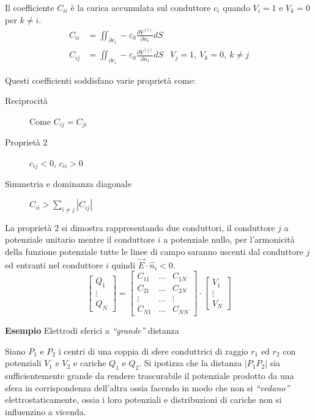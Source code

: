 Il coefficiente $C_{ii}$ è la carica accumulata sul conduttore $c_i$ quando $V_i=1$ e $V_k = 0$
per $k\neq i$.
$$
\begin{aligned}
C_{ii} &= \iint_{\partial c_i} -\varepsilon_0\frac{\partial V^{(i)}}{\partial n_i} dS\\
C_{ij} &= \iint_{\partial c_i} -\varepsilon_0\frac{\partial V^{(j)}}{\partial n_i} dS & V_j = 1,\ 
V_k = 0,\ k\neq j
\end{aligned}
$$

Questi coefficienti soddisfano varie proprietà come:

\begin{description}
 \item[Reciprocità] Come $C_{ij} = C_{ji} $
 \item[Proprietà 2] $c_{ij} < 0 $, $c_{ii}>0$
 \item[Simmetria e dominanza diagonale] $C_{ii} > \sum_{i\neq j}|C_{ij}|$
\end{description}
La proprietà 2 si dimostra rappresentando due conduttori, il conduttore $j$ a 
potenziale unitario mentre il conduttore $i$ a potenziale nullo, per l'armonicità della funzione
potenziale tutte le linee di campo saranno uscenti dal conduttore $j$ ed entranti nel conduttore 
$i$ quindi $\vec{E}\cdot\hat{n}_i < 0$.
$$ %
\begin{bmatrix}
Q_1\\
\vdots \\
Q_N
\end{bmatrix} = 
\begin{bmatrix}
C_{11} & ... & C_{1N} \\
C_{21} & ... & C_{2N} \\
\vdots & ... & \vdots \\
C_{N1} & ... & C_{NN}
\end{bmatrix} \cdot
\begin{bmatrix}
V_1 \\
\vdots \\
V_N
\end{bmatrix}
$$

\textbf{Esempio} Elettrodi sferici a \textit{``grande''} distanza

Siano $P_1$ e $P_2$ i centri di una coppia di sfere conduttrici di raggio $r_1$ ed $r_2$ con potenziali $V_1$ e
$V_2$ e cariche $Q_1$ e $Q_2$.
Si ipotizza che la distanza $|P_1P_2|$ sia sufficientemente grande da rendere trascurabile il potenziale
prodotto da una sfera in corrispondenza dell'altra ossia facendo in modo che non si \textit{``vedano''} 
elettrostaticamente, ossia i loro potenziali e distribuzioni di cariche non si influenzino a vicenda.


